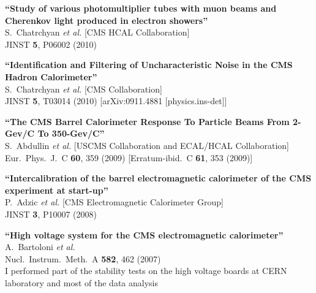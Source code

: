 \documentclass[10pt, a4paper]{article}
\begin{document}
\begin{thebibliography}{599}

{\bf ``Study of various photomultiplier tubes with muon beams and Cherenkov light produced in electron showers''}
  \\{}S.~Chatrchyan {\it et al.}  [CMS HCAL Collaboration]
  \\{}JINST {\bf 5}, P06002 (2010)

{\bf ``Identification and Filtering of Uncharacteristic Noise in the CMS Hadron Calorimeter''}
  \\{}S.~Chatrchyan {\it et al.}  [CMS Collaboration]
  \\{}JINST {\bf 5}, T03014 (2010)
  [arXiv:0911.4881 [physics.ins-det]]

{\bf ``The CMS Barrel Calorimeter Response To Particle Beams From 2-Gev/C To 350-Gev/C''}
  \\{}S.~Abdullin {\it et al.}  [USCMS Collaboration and ECAL/HCAL
                  Collaboration]
  \\{}Eur.\ Phys.\ J.\  C {\bf 60}, 359 (2009)
  [Erratum-ibid.\  C {\bf 61}, 353 (2009)]

{\bf ``Intercalibration of the barrel electromagnetic calorimeter of the CMS  experiment at start-up''}
  \\{}P.~Adzic {\it et al.}  [CMS Electromagnetic Calorimeter Group]
  \\{}JINST {\bf 3}, P10007 (2008)

{\bf ``High voltage system for the CMS electromagnetic calorimeter''}
  \\{}A.~Bartoloni {\it et al.}
  \\{}Nucl.\ Instrum.\ Meth.\  A {\bf 582}, 462 (2007)
  \\ I performed part of the stability tests on the high voltage boards at CERN laboratory and most of the data analysis 


\end{thebibliography}
\end{document}

